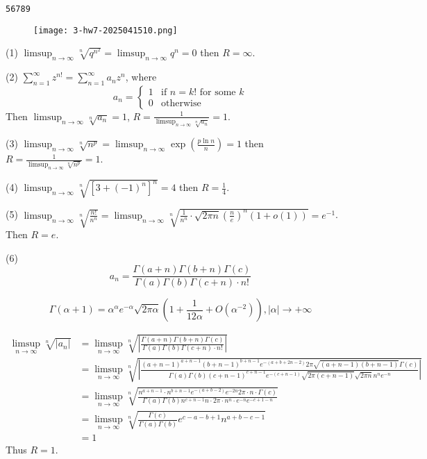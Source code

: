 \begin{lstlisting}
56789
\end{lstlisting}
\begin{exercise}
\begin{figure}[H]
\centering
\texttt{[image: 3-hw7-2025041510.png]}
\label{}
\end{figure}
\end{exercise}
(1) $\limsup_{ n \to \infty } \sqrt[n]{ q^{n^2} }=\limsup_{ n \to \infty }q^{n}=0$ then $R=\infty$.

(2) $\sum_{n=1}^{\infty}z^{n!}=\sum_{n=1}^{\infty}a_nz^{n}$, where
\[
a_n=\begin{cases}
1 & \text{if }n=k!\text{ for some }k \\
0 & \text{otherwise}
\end{cases}
\]
Then $\limsup_{ n \to \infty }\sqrt[n]{ a_n }=1$, $R=\frac{1}{\limsup_{ n \to \infty }\sqrt[n]{ a_n }}=1$.

(3) $\limsup_{ n \to \infty }\sqrt[n]{ n^{p} }=\limsup_{ n \to \infty }\exp\left( \frac{p\ln n}{n} \right)=1$ then $R=\frac{1}{\limsup_{ n \to \infty }\sqrt[n]{ n^{p} }}=1$.

(4) $\limsup_{ n \to \infty }\sqrt[n]{ [3+(-1)^{n}]^{n} }=4$ then $R=\frac{1}{4}$.

(5) $\limsup_{ n \to \infty }\sqrt[n]{ \frac{n!}{n^{n}} }=\limsup_{ n \to \infty }\sqrt[n]{ \frac{1}{n^{n}}\cdot\sqrt{ 2\pi n }\left( \frac{n}{e} \right)^{n}(1+o(1)) }=e^{-1}$. Then $R=e$.

(6)
\[
a_n=\frac{\Gamma(a+n)\Gamma(b+n)\Gamma(c)}{\Gamma(a)\Gamma(b)\Gamma(c+n)\cdot n!}
\]
\begin{lemma}
\[
\Gamma(\alpha+1)=\alpha^\alpha e^{-\alpha} \sqrt{2 \pi \alpha}\left(1+\frac{1}{12 \alpha}+O\left(\alpha^{-2}\right)\right), \lvert \alpha \rvert  \rightarrow+\infty
\]
\end{lemma}
\[
\begin{aligned}
\limsup_{ n \to \infty } \sqrt[n]{ \lvert a_n \rvert  } & =
\limsup_{ n \to \infty } \sqrt[n]{ \left\lvert  \frac{\Gamma(a+n)\Gamma(b+n)\Gamma(c)}{\Gamma(a)\Gamma(b)\Gamma(c+n)\cdot n!}  \right\rvert  } \\
 & =
\limsup_{ n \to \infty } \sqrt[n]{ \left\lvert  \frac{(a+n-1)^{a+n-1}(b+n-1)^{b+n-1}e^{ -(a+b+2n-2) }2\pi\sqrt{ (a+n-1)(b+n-1) }\Gamma(c) }{\Gamma(a)\Gamma(b)(c+n-1)^{c+n-1}e^{ -(c+n-1) }\sqrt{ 2\pi(c+n-1) }\sqrt{ 2\pi n }n^{n}e^{ -n }}  \right\rvert  } \\
 & =\limsup_{ n \to \infty } \sqrt[n]{ \frac{n^{a+n-1}\cdot n^{b+n-1}e^{ -(a+b-2)}e^{ -2n }2\pi \cdot n\cdot\Gamma(c) }{\Gamma(a)\Gamma(b)n^{c+n-1}n\cdot2\pi \cdot n^{n}\cdot e^{ -n }e^{ -c+1-n }} } \\
 & =\limsup_{ n \to \infty } \sqrt[n]{ \frac{\Gamma(c)}{\Gamma(a)\Gamma(b)}e^{ c-a-b+1 }n^{a+b-c-1} } \\
 & =1
\end{aligned}
\]
Thus $R=1$.

